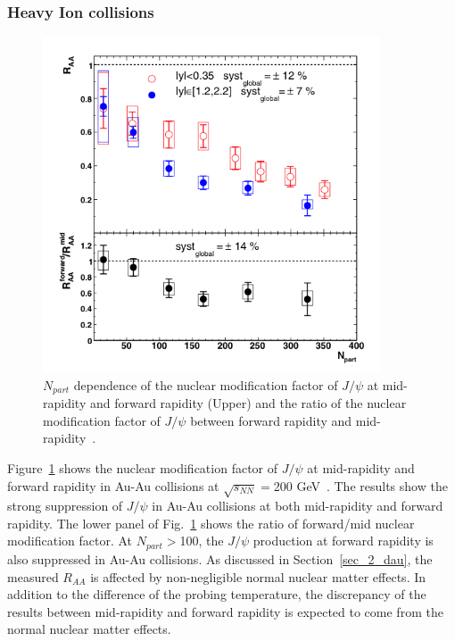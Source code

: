 \subsubsection{Heavy Ion collisions}
\begin{figure}[!h]
  \centering
  \includegraphics[width=10cm]{chap2/figure/experimentaldata/rhicjpsiaa.png}
  \caption{$N_{part}$ dependence of the nuclear modification factor of $J/\psi$ at mid-rapidity and forward rapidity (Upper) and the ratio of the nuclear modification factor of $J/\psi$ between forward rapidity and mid-rapidity~\cite{bib_rhicjpsiraa}.}
  \label{fig_2_rhicjpsiaa}
\end{figure}
Figure~\ref{fig_2_rhicjpsiaa} shows the nuclear modification factor of $J/\psi$ at mid-rapidity and forward rapidity in Au-Au collisions at $\sqrt{s_{NN}}=$200 GeV~\cite{bib_rhicjpsiraa}. 
The results show the strong suppression of $J/\psi$ in Au-Au collisions at both mid-rapidity and forward rapidity. 
The lower panel of Fig.~\ref{fig_2_rhicjpsiaa} shows the ratio of forward/mid nuclear modification factor.  
At $N_{part} > $100, the $J/\psi$ production at forward rapidity is also suppressed in Au-Au collisions. 
As discussed in Section~\ref{sec_2_dau}, the measured $R_{AA}$ is affected by non-negligible normal nuclear matter effects.
In addition to the difference of the probing temperature,  the discrepancy of the results between mid-rapidity and forward rapidity is expected to come from the normal nuclear matter effects. 

